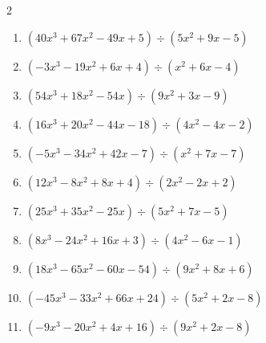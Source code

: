 \begin{multicols}{2}
\begin{enumerate}
        \phantom{$商 : 4x+8, \quad 剰余 : -5x-9$}

  \item $(40x^{3}+67x^{2}-49x+5) \div (5x^{2}+9x-5)$

        \phantom{$商 : 8x-1, \quad 剰余 : -3x-1$}

  \item $(-3x^{3}-19x^{2}+6x+4) \div (x^{2}+6x-4)$

        \phantom{$商 : -3x-1, \quad 剰余 : -7x-4$}

  \item $(54x^{3}+18x^{2}-54x) \div (9x^{2}+3x-9)$

        \phantom{$商 : 6x, \quad 剰余 : x$}

\columnbreak %

  \item $(16x^{3}+20x^{2}-44x-18) \div (4x^{2}-4x-2)$

        \phantom{$商 : 4x+9, \quad 剰余 : -9x+7$}

  \item $(-5x^{3}-34x^{2}+42x-7) \div (x^{2}+7x-7)$

        \phantom{$商 : -5x+1, \quad 剰余 : -6x-5$}

  \item $(12x^{3}-8x^{2}+8x+4) \div (2x^{2}-2x+2)$

        \phantom{$商 : 6x+2, \quad 剰余 : 5x+9$}

  \item $(25x^{3}+35x^{2}-25x) \div (5x^{2}+7x-5)$

        \phantom{$商 : 5x, \quad 剰余 : -2x+5$}

  \item $(8x^{3}-24x^{2}+16x+3) \div (4x^{2}-6x-1)$

        \phantom{$商 : 2x-3, \quad 剰余 : 5x$}

\columnbreak %

\resetques

  \item $(18x^{3}-65x^{2}-60x-54) \div (9x^{2}+8x+6)$

        \phantom{$商 : 2x-9, \quad 剰余 : x-6$}

  \item $(-45x^{3}-33x^{2}+66x+24) \div (5x^{2}+2x-8)$

        \phantom{$商 : -9x-3, \quad 剰余 : -2x-8$}

  \item $(-9x^{3}-20x^{2}+4x+16) \div (9x^{2}+2x-8)$


\end{enumerate}
\end{multicols}
